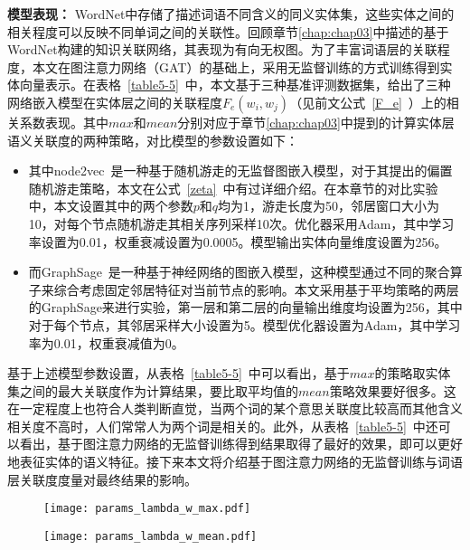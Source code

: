 \textbf{模型表现：}
WordNet中存储了描述词语不同含义的同义实体集，这些实体之间的相关程度可以反映不同单词之间的关联性。回顾章节\ref{chap:chap03}中描述的基于WordNet构建的知识关联网络，其表现为有向无权图。为了丰富词语层的关联程度，本文在图注意力网络（GAT）的基础上，采用无监督训练的方式训练得到实体向量表示。在表格~\ref{table5-5}~中，本文基于三种基准评测数据集，给出了三种网络嵌入模型在实体层之间的关联程度$F_e(w_i, w_j)$（见前文公式~\ref{F_e}~）上的相关系数表现。其中$max$和$mean$分别对应于章节\ref{chap:chap03}中提到的计算实体层语义关联度的两种策略，对比模型的参数设置如下：
\begin{itemize}
    \item 其中node2vec~\cite{kdd/GroverL16}是一种基于随机游走的无监督图嵌入模型，对于其提出的偏置随机游走策略，本文在公式~\ref{zeta}~中有过详细介绍。在本章节的对比实验中，本文设置其中的两个参数$p$和$q$均为1，游走长度为50，邻居窗口大小为10，对每个节点随机游走其相关序列采样10次。优化器采用Adam，其中学习率设置为0.01，权重衰减设置为0.0005。模型输出实体向量维度设置为256。
    \item 而GraphSage~\cite{nips/HamiltonYL17}是一种基于神经网络的图嵌入模型，这种模型通过不同的聚合算子来综合考虑固定邻居特征对当前节点的影响。本文采用基于平均策略的两层的GraphSage来进行实验，第一层和第二层的向量输出维度均设置为256，其中对于每个节点，其邻居采样大小设置为5。模型优化器设置为Adam，其中学习率为0.01，权重衰减值为0。
\end{itemize}

基于上述模型参数设置，从表格~\ref{table5-5}~中可以看出，基于$max$的策略取实体集之间的最大关联度作为计算结果，要比取平均值的$mean$策略效果要好很多。这在一定程度上也符合人类判断直觉，当两个词的某个意思关联度比较高而其他含义相关度不高时，人们常常人为两个词是相关的。此外，从表格~\ref{table5-5}~中还可以看出，基于图注意力网络的无监督训练得到结果取得了最好的效果，即可以更好地表征实体的语义特征。接下来本文将介绍基于图注意力网络的无监督训练与词语层关联度度量对最终结果的影响。

\begin{figure}[htbp]
    \begin{minipage}{0.48\textwidth}
      \centering
      \texttt{[image: params\_lambda\_w\_max.pdf]}
      \label{fig:lambda_w_max}
    \end{minipage}\hfill
    \begin{minipage}{0.48\textwidth}
      \centering
      \texttt{[image: params\_lambda\_w\_mean.pdf]}
      \label{fig:lambda_w_mean}
    \end{minipage}
    \label{fig:wordnet_sr}
\end{figure}

